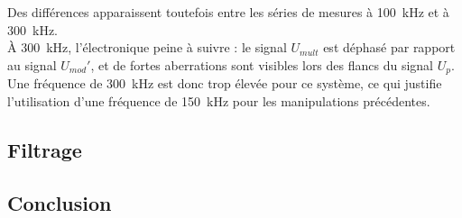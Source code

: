 Des différences apparaissent toutefois entre les séries de mesures à 100~kHz et à 300~kHz. \\  
À 300~kHz, l’électronique peine à suivre : le signal \( U_{mult} \) est déphasé par rapport au signal \( U_{mod}' \),  
et de fortes aberrations sont visibles lors des flancs du signal \( U_{p} \). \\  
Une fréquence de 300~kHz est donc trop élevée pour ce système, ce qui justifie  
l’utilisation d’une fréquence de 150~kHz pour les manipulations précédentes.


\subsection{Filtrage}





\subsection{Conclusion}